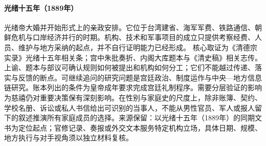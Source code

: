 \hypertarget{public:EQ-1889-GUANGXU-MARRIAGE}{}\paragraph{光绪十五年（1889年）}光绪帝大婚并开始形式上的亲政安排。它位于台湾建省、海军军费、铁路通信、朝鲜危机与口岸经济并行的时期。机构、技术和军事项目的成立只提供考察经费、人员、维护与地方采纳的起点，并不自行证明能力已经形成。 核心取证为《清德宗实录》光绪十五年相关条；宫中朱批奏折、内阁大库题本与《清史稿》相关志传。上谕、题本与部议可确认规则如何被提出和机构如何分工；它们不能越过传递、落实与反馈的断点。可继续追问的研究问题是宫廷政治、制度运作与中央—地方信息链研究。账本列出的条件为皇帝成年要求完成宫廷礼制程序。需要分层验证的影响为慈禧仍对重要决策保有深刻影响。在性别与家庭史的尺度上，除非账簿、契约、学校名册、诉讼或私人书信给出可识别的当事人，不能从男性官员、军人或报人留下的叙述推演所有家庭成员的选择。来源保留：以光绪十五年（1889年）的同期文书为定位起点；官修记录、奏报或外交文本服务特定机构立场，具体日期、规模、地方执行与对手视角须以独立材料复核。
